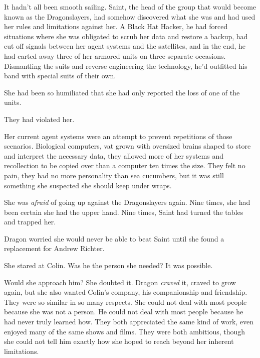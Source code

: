 It hadn't all been smooth sailing.  Saint, the head of the group that would become known as the Dragonslayers, had somehow discovered what she was and had used her rules and limitations against her.  A Black Hat Hacker, he had forced situations where she was obligated to scrub her data and restore a backup, had cut off signals between her agent systems and the satellites, and in the end, he had carted away three of her armored units on three separate occasions.  Dismantling the suits and reverse engineering the technology, he'd outfitted his band with special suits of their own.



She had been so humiliated that she had only reported the loss of one of the units.



They had violated her.



Her current agent systems were an attempt to prevent repetitions of those scenarios.  Biological computers, vat grown with oversized brains shaped to store and interpret the necessary data, they allowed more of her systems and recollection to be copied over than a computer ten times the size.  They felt no pain, they had no more personality than sea cucumbers, but it was still something she suspected she should keep under wraps.



She was \emph{afraid} of going up against the Dragonslayers again.  Nine times, she had been certain she had the upper hand.  Nine times, Saint had turned the tables and trapped her.



Dragon worried she would never be able to beat Saint until she found a replacement for Andrew Richter.



She stared at Colin.  Was he the person she needed?  It was possible.



Would she approach him?  She doubted it.  Dragon \emph{craved} it, craved to grow again, but she also wanted Colin's company, his companionship and friendship.  They were so similar in so many respects.  She could not deal with most people because she was not a person.  He could not deal with most people because he had never truly learned how.  They both appreciated the same kind of work, even enjoyed many of the same shows and films.  They were both ambitious, though she could not tell him exactly how she hoped to reach beyond her inherent limitations.




